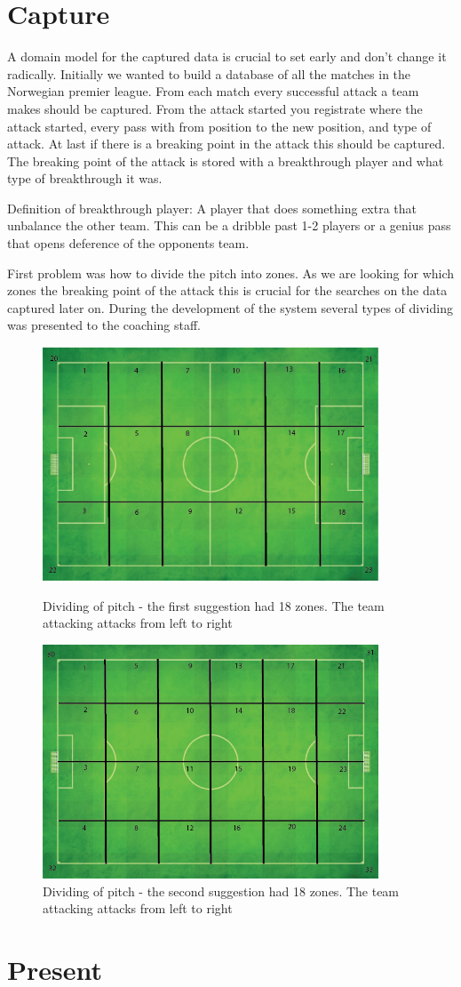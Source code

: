 \section{Capture}

A domain model for the captured data is crucial to set early and don't change it radically. Initially we wanted to build a database of all the matches in the Norwegian premier league. From each match every successful attack a team makes should be captured. From the attack started you registrate where the attack started, every pass with from position to the new position, and type of attack. At last if there is a breaking point in the attack this should be captured. The breaking point of the attack is stored with a breakthrough player and what type of breakthrough it was.

Definition of breakthrough player: A player that does something extra that unbalance the other team. This can be a dribble past 1-2 players or a genius pass that opens deference of the opponents team. 

First problem was how to divide the pitch into zones. As we are looking for which zones the breaking point of the attack this is crucial for the searches on the data captured later on. During the development of the system several types of dividing was presented to the coaching staff. 

\begin{figure}[ht!]
\centering
\includegraphics[width=100mm]{images/general/first_zones.png}
\caption{Dividing of pitch - the first suggestion had 18 zones. The team attacking attacks from left to right}
\includegraphics[width=100mm]{images/general/second_zones.png}
\caption{Dividing of pitch - the second suggestion had 18 zones. The team attacking attacks from left to right}
\label{overflow}
\end{figure}

\section{Present}
